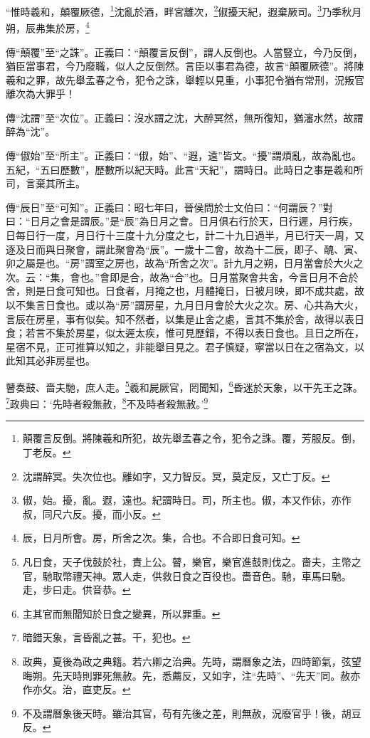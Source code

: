 “惟時羲和，顛覆厥德，\footnote{顛覆言反倒。將陳羲和所犯，故先舉孟春之令，犯令之誅。覆，芳服反。倒，丁老反。}沈亂於酒，畔宮離次，\footnote{沈謂醉冥。失次位也。離如字，又力智反。冥，莫定反，又亡丁反。}俶擾天紀，遐棄厥司。\footnote{俶，始。擾，亂。遐，遠也。紀謂時日。司，所主也。俶，本又作{\hanaa 㑐}，亦作叔，同尺六反。擾，而小反。}乃季秋月朔，辰弗集於房，\footnote{辰，日月所會。房，所舍之次。集，合也。不合即日食可知。}

{\noindent\zhuan{}\fzbyks 傳“顛覆”至“之誅”。正義曰：“顛覆言反倒”，謂人反倒也。人當豎立，今乃反倒，猶臣當事君，今乃廢職，似人之反倒然。言臣以事君為德，故言“顛覆厥德”。將陳羲和之罪，故先舉孟春之令，犯令之誅，舉輕以見重，小事犯令猶有常刑，況叛官離次為大罪乎！ \par}

{\noindent\zhuan{}\fzbyks 傳“沈謂”至“次位”。正義曰：沒水謂之沈，大醉冥然，無所復知，猶瀋水然，故謂醉為“沈”。 \par}

{\noindent\zhuan{}\fzbyks 傳“俶始”至“所主”。正義曰：“俶，始”、“遐，遠”皆文。“擾”謂煩亂，故為亂也。五紀，“五曰歷數”，歷數所以紀天時。此言“天紀”，謂時日。此時日之事是羲和所司，言棄其所主。 \par}

{\noindent\zhuan{}\fzbyks 傳“辰日”至“可知”。正義曰：昭七年曰，晉侯問於士文伯曰：“何謂辰？”對曰：“日月之會是謂辰。”是“辰”為日月之會。日月俱右行於天，日行遲，月行疾，日每日行一度，月日行十三度十九分度之七，計二十九日過半，月已行天一周，又逐及日而與日聚會，謂此聚會為“辰”。一歲十二會，故為十二辰，即子、醜、寅、卯之屬是也。“房”謂室之房也，故為“所舍之次”。計九月之朔，日月當會於大火之次。云：“集，會也。”會即是合，故為“合”也。日月當聚會共舍，今言日月不合於舍，則是日食可知也。日食者，月掩之也，月體掩日，日被月映，即不成共處，故以不集言日食也。或以為“房”謂房星，九月日月會於大火之次。房、心共為大火，言辰在房星，事有似矣。知不然者，以集是止舍之處，言其不集於舍，故得以表日食；若言不集於房星，似太遲太疾，惟可見歷錯，不得以表日食也。且日之所在，星宿不見，正可推算以知之，非能舉目見之。君子慎疑，寧當以日在之宿為文，以此知其必非房星也。 \par}

瞽奏鼓、嗇夫馳，庶人走。\footnote{凡日食，天子伐鼓於社，責上公。瞽，樂官，樂官進鼓則伐之。嗇夫，主幣之官，馳取幣禮天神。眾人走，供救日食之百役也。嗇音色。馳，車馬曰馳。走，步曰走。供音恭。}羲和屍厥官，罔聞知，\footnote{主其官而無聞知於日食之變異，所以罪重。}昏迷於天象，以干先王之誅。\footnote{暗錯天象，言昏亂之甚。干，犯也。}政典曰：‘先時者殺無赦，\footnote{政典，夏後為政之典籍。若六卿之治典。先時，謂曆象之法，四時節氣，弦望晦朔。先天時則罪死無赦。先，悉薦反，又如字，注“先時”、“先天”同。赦亦作亦攵。治，直吏反。}不及時者殺無赦。’\footnote{不及謂曆象後天時。雖治其官，苟有先後之差，則無赦，況廢官乎！後，胡豆反。}

